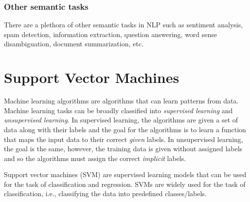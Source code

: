 \subsubsection{Other semantic tasks}

There are a plethora of other semantic tasks in NLP such as sentiment analysis, spam detection, information extraction, question answering, word sense disambiguation, document summarization, etc.



\section{Support Vector Machines}\label{sec:SVM}


Machine learning algorithms are algorithms that can learn patterns from data. Machine learning tasks can be broadly classified into \emph{supervised learning} and \emph{unsupervised learning}. In supervised learning, the algorithms are given a set of data along with their labels and the goal for the algorithms is to learn a function that maps the input data to their correct \emph{given} labels. In unsupervised learning, the goal is the same, however, the training data is given without assigned labels and so the algorithms must assign the correct \emph{implicit} labels.

Support vector machines (SVM) are supervised learning models that can be used for the task of classification and regression. SVMs are widely used for the task of classification, i.e., classifying the data into predefined classes/labels.

